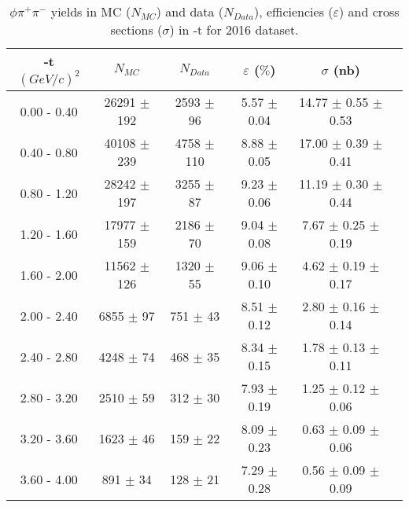 \begin{center}
\begin{table}[h]
    \caption{$\phi \pi^{+}\pi^{-}$ yields in MC ($N_{MC}$) and data ($N_{Data}$), efficiencies ($\varepsilon$) and cross sections ($\sigma$) in $\mbox{-t}$ for 2016 dataset.}
    \label{tab.y2175.xsec_ul.phi2pi.1.2}
    \begin{tabular}{|c|c|c|c|c|c|}
    \hline
    -t $(GeV/c)^{2}$ & $N_{MC}$ & $N_{Data}$ & $\varepsilon$ ($\%$) & $\sigma$ (nb) \\ 
    \hline
   0.00 - 0.40 & 26291 $\pm$ 192 & 2593 $\pm$ 96 & 5.57 $\pm$ 0.04 & 14.77 $\pm$ 0.55 $\pm$ 0.53 \\ 
   0.40 - 0.80 & 40108 $\pm$ 239 & 4758 $\pm$ 110 & 8.88 $\pm$ 0.05 & 17.00 $\pm$ 0.39 $\pm$ 0.41 \\ 
   0.80 - 1.20 & 28242 $\pm$ 197 & 3255 $\pm$ 87 & 9.23 $\pm$ 0.06 & 11.19 $\pm$ 0.30 $\pm$ 0.44 \\ 
   1.20 - 1.60 & 17977 $\pm$ 159 & 2186 $\pm$ 70 & 9.04 $\pm$ 0.08 & 7.67 $\pm$ 0.25 $\pm$ 0.19 \\ 
   1.60 - 2.00 & 11562 $\pm$ 126 & 1320 $\pm$ 55 & 9.06 $\pm$ 0.10 & 4.62 $\pm$ 0.19 $\pm$ 0.17 \\ 
   2.00 - 2.40 & 6855 $\pm$ 97 & 751 $\pm$ 43 & 8.51 $\pm$ 0.12 & 2.80 $\pm$ 0.16 $\pm$ 0.14 \\ 
   2.40 - 2.80 & 4248 $\pm$ 74 & 468 $\pm$ 35 & 8.34 $\pm$ 0.15 & 1.78 $\pm$ 0.13 $\pm$ 0.11 \\ 
   2.80 - 3.20 & 2510 $\pm$ 59 & 312 $\pm$ 30 & 7.93 $\pm$ 0.19 & 1.25 $\pm$ 0.12 $\pm$ 0.06 \\ 
   3.20 - 3.60 & 1623 $\pm$ 46 & 159 $\pm$ 22 & 8.09 $\pm$ 0.23 & 0.63 $\pm$ 0.09 $\pm$ 0.06 \\ 
   3.60 - 4.00 & 891 $\pm$ 34 & 128 $\pm$ 21 & 7.29 $\pm$ 0.28 & 0.56 $\pm$ 0.09 $\pm$ 0.09 \\ 
   \hline
\end{tabular}
\end{table}
\end{center}
   
